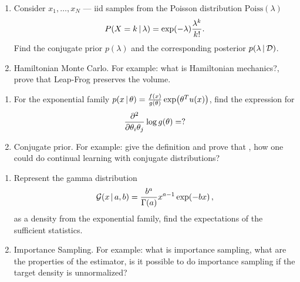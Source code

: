 \documentclass{article}
\begin{document}
\begin{question}
\begin{enumerate}
    \item Consider $x_1,\ldots,x_N$ --- iid samples from the Poisson distribution $\text{Poiss}(\lambda)$
    \begin{align*}
        P(X = k\,|\, \lambda) = \exp(-\lambda)\frac{\lambda^k}{k!}.
    \end{align*}
    Find the conjugate prior $p(\lambda)$ and the corresponding posterior $p(\lambda\,|\, \mathcal{D})$.
    \item Hamiltonian Monte Carlo. For example: what is Hamiltonian mechanics?, prove that Leap-Frog preserves the volume.
\end{enumerate}
\end{question}

\begin{question}
\begin{enumerate}
    \item For the exponential family $p(x\cond \theta) = \frac{f(x)}{g(\theta)}\exp\left(\theta^Tu(x)\right)$, find the expression for
    \begin{align*}
        \frac{\partial ^2}{\partial \theta_i\theta_j}\log g(\theta) = ?
    \end{align*}
    \item Conjugate prior. For example: give the definition and prove that , how one could do continual learning with conjugate distributions?
\end{enumerate}
\end{question}

\begin{question}
\begin{enumerate}
    \item Represent the gamma distribution
    \begin{align*}
        \mathcal{G}(x\,|\, a,b) = \frac{b^a}{\Gamma(a)}x^{a-1}\exp(-b x)\,,
    \end{align*}
    as a density from the exponential family, find the expectations of the sufficient statistics.
    \item Importance Sampling. For example: what is importance sampling, what are the properties of the estimator, is it possible to do importance sampling if the target density is unnormalized?
\end{enumerate}
\end{question}
\end{document}

